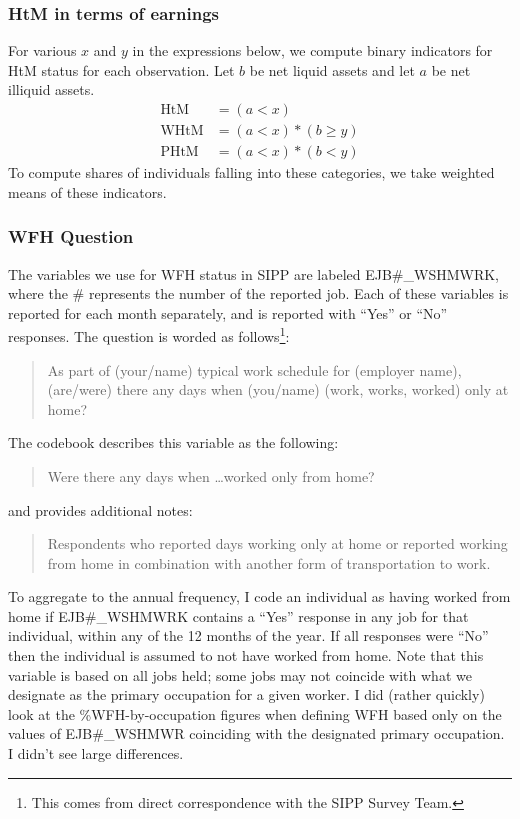 \documentclass{article}
\begin{document}
\subsubsection{HtM in terms of earnings}
For various $x$ and $y$ in the expressions below, we compute binary indicators for HtM status for each observation. Let $b$ be net liquid assets and let $a$ be net illiquid assets.
\begin{align*}
\text{HtM} &= (a < x) \\
\text{WHtM} &= (a < x) * (b \geq y) \\
\text{PHtM} &= (a < x) * (b < y)
\end{align*}
To compute shares of individuals falling into these categories, we take weighted means of these indicators.

\subsubsection{WFH Question}
The variables we use for WFH status in SIPP are labeled EJB\#\_WSHMWRK,
where the \# represents the number of the reported job.
Each of these variables is reported for each month separately, and is reported with ``Yes'' or ``No'' responses.
The question is worded as follows\footnote{This comes from direct correspondence with the SIPP Survey Team.}:
\begin{quote}
As part of (your/name) typical work schedule for (employer name), (are/were) there any days when (you/name) (work, works, worked) only at home?
\end{quote}

\if The codebook describes this variable as the following:
\begin{quote}
Were there any days when \ldots worked only from home?
\end{quote}
and provides additional notes:
\begin{quote}
Respondents who reported days working only at home or reported working from home in combination with another form of transportation to work.
\end{quote}
\fi
To aggregate to the annual frequency, I code an individual as having worked from home if EJB\#\_WSHMWRK contains a ``Yes'' response in any job for that individual, within any of the 12 months of the year. If all responses were ``No'' then the individual is assumed to not have worked from home.
Note that this variable is based on all jobs held; some jobs may not coincide with what we designate as the primary occupation for a given worker. I did (rather quickly) look at the \%WFH-by-occupation figures when defining WFH based only on the values of EJB\#\_WSHMWR coinciding with the designated primary occupation. I didn't see large differences.
\end{document}

